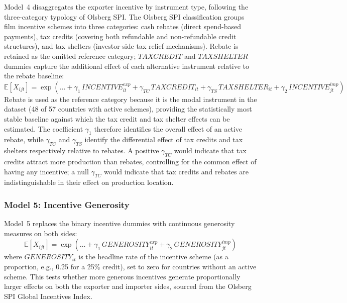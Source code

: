 Model~4 disaggregates the exporter incentive by instrument type, following the three-category typology of Olsberg SPI. The Olsberg SPI classification groups film incentive schemes into three categories: cash rebates (direct spend-based payments), tax credits (covering both refundable and non-refundable credit structures), and tax shelters (investor-side tax relief mechanisms). Rebate is retained as the omitted reference category; $TAXCREDIT$ and $TAXSHELTER$ dummies capture the additional effect of each alternative instrument relative to the rebate baseline:
\begin{equation}
\mathbb{E}[X_{ijt}] = \exp\left(\ldots + \gamma_1\, INCENTIVE_{it}^{exp} + \gamma_{TC}\, TAXCREDIT_{it} + \gamma_{TS}\, TAXSHELTER_{it} + \gamma_2\, INCENTIVE_{jt}^{imp}\right)
\label{eq:model4}
\end{equation}
Rebate is used as the reference category because it is the modal instrument in the dataset (48 of 57 countries with active schemes), providing the statistically most stable baseline against which the tax credit and tax shelter effects can be estimated. The coefficient $\gamma_1$ therefore identifies the overall effect of an active rebate, while $\gamma_{TC}$ and $\gamma_{TS}$ identify the differential effect of tax credits and tax shelters respectively relative to rebates. A positive $\gamma_{TC}$ would indicate that tax credits attract more production than rebates, controlling for the common effect of having any incentive; a null $\gamma_{TC}$ would indicate that tax credits and rebates are indistinguishable in their effect on production location.

\subsubsection{Model 5: Incentive Generosity}

Model~5 replaces the binary incentive dummies with continuous generosity measures on both sides:
\begin{equation}
\mathbb{E}[X_{ijt}] = \exp\left(\ldots + \gamma_1\, GENEROSITY_{it}^{exp} + \gamma_2\, GENEROSITY_{jt}^{imp}\right)
\label{eq:model5}
\end{equation}
where $GENEROSITY_{it}$ is the headline rate of the incentive scheme (as a proportion, e.g., 0.25 for a 25\% credit), set to zero for countries without an active scheme. This tests whether more generous incentives generate proportionally larger effects on both the exporter and importer sides, sourced from the Olsberg SPI Global Incentives Index.

